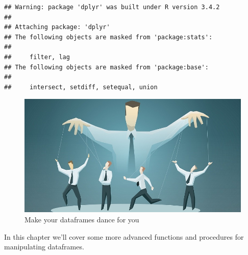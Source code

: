 \documentclass[]{book}
\theoremstyle{definition}
\theoremstyle{definition}
\theoremstyle{remark}
\begin{document}
\begin{verbatim}
## Warning: package 'dplyr' was built under R version 3.4.2
## 
## Attaching package: 'dplyr'
## The following objects are masked from 'package:stats':
## 
##     filter, lag
## The following objects are masked from 'package:base':
## 
##     intersect, setdiff, setequal, union
\end{verbatim}

\begin{figure}

{\centering \includegraphics[width=0.75\linewidth]{images/manipulation} 

}

\caption{Make your dataframes dance for you}\label{fig:dance}
\end{figure}

In this chapter we'll cover some more advanced functions and procedures
for manipulating dataframes.
\end{document}
